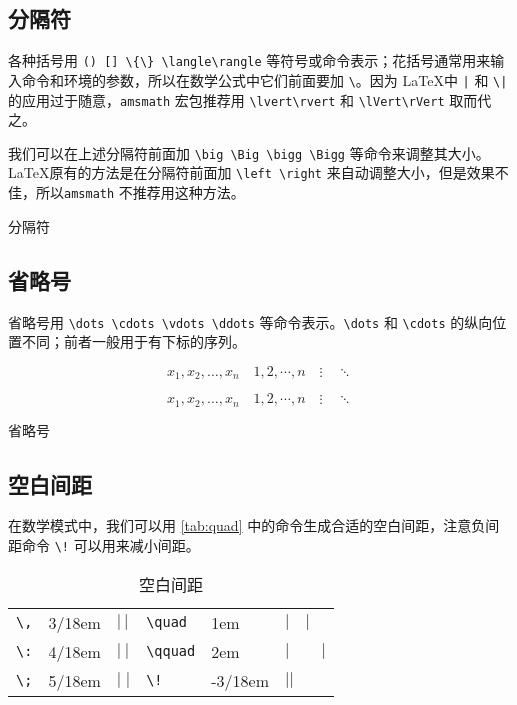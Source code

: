 \subsection{分隔符}

各种括号用 \verb|() [] \{\} \langle\rangle| 等符号或命令表示；花括号通常用来输入命令和环境的参数，所以在数学公式中它们前面要加 \verb|\|。因为 \LaTeX 中 \verb+|+ 和 \verb+\|+ 的应用过于随意，\texttt{amsmath} 宏包推荐用 \verb|\lvert\rvert| 和 \verb|\lVert\rVert| 取而代之。

我们可以在上述分隔符前面加 \verb|\big \Big \bigg \Bigg| 等命令来调整其大小。\LaTeX 原有的方法是在分隔符前面加 \verb|\left \right| 来自动调整大小，但是效果不佳，所以\texttt{amsmath} 不推荐用这种方法。

\begin{example}[h]
\caption{分隔符}
\label{exa:delimiters}
\end{example}

\subsection{省略号}

省略号用 \verb|\dots \cdots \vdots \ddots| 等命令表示。\verb|\dots| 和 \verb|\cdots| 的纵向位置不同；前者一般用于有下标的序列。

\begin{Code}[]
\[ x_1,x_2,\dots,x_n\quad 1,2,\cdots,n\quad 
  \vdots\quad \ddots \]
\end{Code}

\begin{example}[h]
\begin{Demo}
\[ x_1,x_2,\dots,x_n\quad 1,2,\cdots,n\quad 
  \vdots\quad \ddots \]
\end{Demo}
\caption{省略号}
\label{exa:dots}
\end{example}

\subsection{空白间距}

在数学模式中，我们可以用 \autoref{tab:quad} 中的命令生成合适的空白间距，注意负间距命令 \verb|\!| 可以用来减小间距。

\begin{table}[htbp]
\caption{空白间距}
\label{tab:quad}
\centering
\begin{tabular}{llllll}
  \toprule
  \verb|\,| & 3/18em & $|\,|$ & \verb|\quad| & 1em & $|\quad|$ \\
  \verb|\:| & 4/18em & $|\:|$ & \verb|\qquad| & 2em & $|\qquad|$ \\
  \verb|\;| & 5/18em & $|\;|$ & \verb|\!| & -3/18em & $|\!|$ \\
  \bottomrule
\end{tabular}
\end{table}

